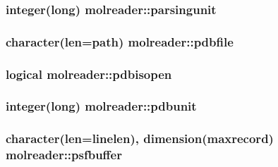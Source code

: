 \hypertarget{classmolreader_ac41219b2f68591f315dded4488483263}{
\subsubsection[{parsingunit}]{\setlength{\rightskip}{0pt plus 5cm}integer(long) molreader\+::parsingunit\hspace{0.3cm}{\ttfamily [private]}}}\label{classmolreader_ac41219b2f68591f315dded4488483263}
\hypertarget{classmolreader_aa372f060e4e581b1c14e2b46a65d2df4}{
\subsubsection[{pdbfile}]{\setlength{\rightskip}{0pt plus 5cm}character(len=path) molreader\+::pdbfile\hspace{0.3cm}{\ttfamily [private]}}}\label{classmolreader_aa372f060e4e581b1c14e2b46a65d2df4}
\hypertarget{classmolreader_ad7636360c8e0ecb526000567dd32d2d0}{
\subsubsection[{pdbisopen}]{\setlength{\rightskip}{0pt plus 5cm}logical molreader\+::pdbisopen\hspace{0.3cm}{\ttfamily [private]}}}\label{classmolreader_ad7636360c8e0ecb526000567dd32d2d0}
\hypertarget{classmolreader_a5b0570862e5318937ea68a01966ed56f}{
\subsubsection[{pdbunit}]{\setlength{\rightskip}{0pt plus 5cm}integer(long) molreader\+::pdbunit\hspace{0.3cm}{\ttfamily [private]}}}\label{classmolreader_a5b0570862e5318937ea68a01966ed56f}
\hypertarget{classmolreader_aab845daa54f6803a37ceb91d7ad296a7}{
\subsubsection[{psfbuffer}]{\setlength{\rightskip}{0pt plus 5cm}character(len={\bf linelen}), dimension({\bf maxrecord}) molreader\+::psfbuffer\hspace{0.3cm}{\ttfamily [private]}}}\label{classmolreader_aab845daa54f6803a37ceb91d7ad296a7}
